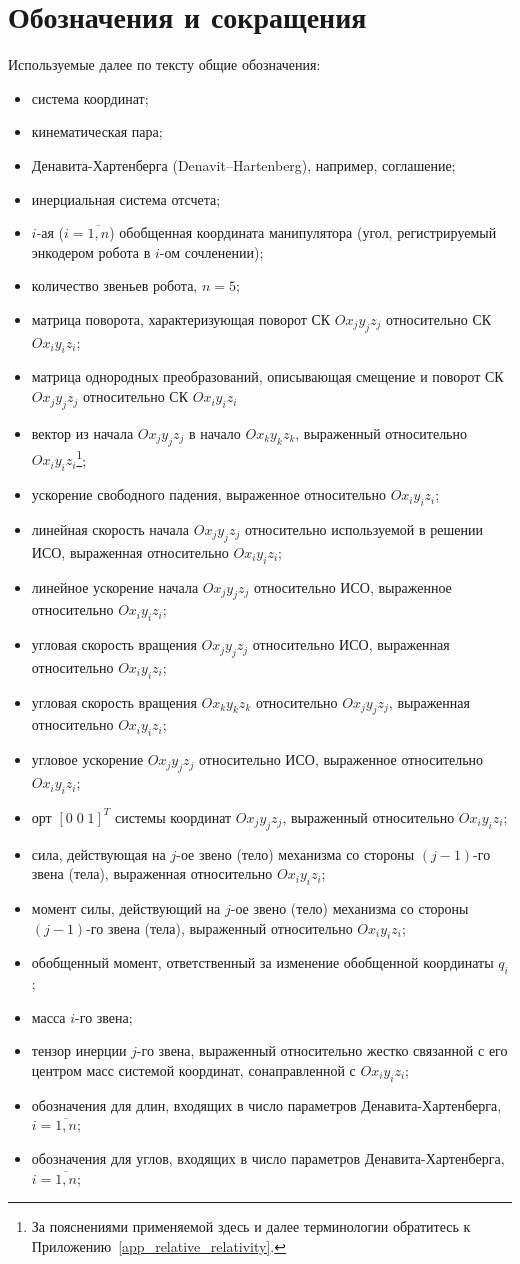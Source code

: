 \section*{Обозначения и сокращения}
Используемые далее по тексту общие обозначения:
\newcommand*{\ditem}[1]{\item[#1~---]}
\begin{itemize}
\ditem{СК} система координат;
\ditem{КП} кинематическая пара;
\ditem{ДХ} Денавита-Хартенберга (Denavit–Hartenberg), например, соглашение;
\ditem{ИСО} инерциальная система отсчета;
\ditem{$q_i$} $i$-ая ($i=\overline{1,n}$) обобщенная координата манипулятора (угол, регистрируемый энкодером робота в $i$-ом сочленении);
\ditem{$n$} количество звеньев робота, $n = 5$;
\ditem{${}^iR_j$} матрица поворота, характеризующая поворот СК $Ox_{j}y_{j}z_{j}$ относительно СК $Ox_{i}y_{i}z_{i}$;
\ditem{${}^iA_j$} матрица однородных преобразований, описывающая смещение и поворот СК $Ox_{j}y_{j}z_{j}$ относительно СК $Ox_{i}y_{i}z_{i}$
\ditem{$r^i_{j,\,k}$} вектор из начала $Ox_{j}y_{j}z_{j}$ в начало $Ox_{k}y_{k}z_{k}$, выраженный относительно $Ox_{i}y_{i}z_{i}$\footnote{За пояснениями применяемой здесь и далее терминологии обратитесь к Приложению~\ref{app_relative_relativity}.};
\ditem{$g_i$} ускорение свободного падения, выраженное относительно $Ox_{i}y_{i}z_{i}$;
\ditem{$V^i_j$} линейная скорость начала $Ox_{j}y_{j}z_{j}$ относительно используемой в решении ИСО, выраженная относительно $Ox_{i}y_{i}z_{i}$;
\ditem{$a^i_j$} линейное ускорение начала $Ox_{j}y_{j}z_{j}$ относительно ИСО, выраженное относительно $Ox_{i}y_{i}z_{i}$;
\ditem{$\omega^i_j$} угловая скорость вращения $Ox_{j}y_{j}z_{j}$ относительно ИСО, выраженная относительно $Ox_{i}y_{i}z_{i}$;
\ditem{$\omega^i_{j,\,k}$} угловая скорость вращения $Ox_{k}y_{k}z_{k}$ относительно $Ox_{j}y_{j}z_{j}$, выраженная относительно $Ox_{i}y_{i}z_{i}$;
\ditem{$\dot\omega^i_j$} угловое ускорение $Ox_{j}y_{j}z_{j}$ относительно ИСО, выраженное относительно $Ox_{i}y_{i}z_{i}$;
\ditem{$z^i_j$} орт $[0\;0\;1]^T$ системы координат $Ox_{j}y_{j}z_{j}$, выраженный относительно $Ox_{i}y_{i}z_{i}$;
\ditem{$f^i_j$} сила, действующая на $j$-ое звено (тело) механизма со стороны $(j-1)$-го звена (тела), выраженная относительно $Ox_{i}y_{i}z_{i}$;
\ditem{$\tau^i_j$} момент силы, действующий на $j$-ое звено (тело) механизма со стороны ${(j-1)}$-го звена (тела), выраженный относительно $Ox_{i}y_{i}z_{i}$;
\ditem{$\tau_i$} обобщенный момент, ответственный за изменение обобщенной координаты $q_i$;
\ditem{$m_i$} масса $i$-го звена;
\ditem{$\mathcal{I}^i_j$} тензор инерции $j$-го звена, выраженный относительно жестко связанной с его центром масс системой координат, сонаправленной с $Ox_{i}y_{i}z_{i}$;
\ditem{$a_i, d_i$} обозначения для длин, входящих в число параметров Де\-на\-ви\-та-Хар\-тен\-бер\-га, $i=\overline{1,n}$;
\ditem{$\alpha_i, \theta_i$} обозначения для углов, входящих в число параметров Де\-на\-ви\-та-Хар\-тен\-бер\-га, $i=\overline{1,n}$;
\end{itemize}
\newpage
